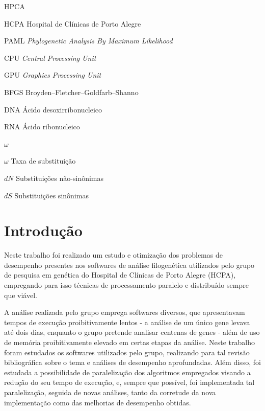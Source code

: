 \documentclass[cic,tc]{iiufrgs}
\begin{document}
\listoffigures

\listoftables

\begin{listofabbrv}{HPCA}
    \item[HCPA] Hospital de Clínicas de Porto Alegre
    \item[PAML] \textit{Phylogenetic Analysis By Maximum Likelihood}
    \item[CPU] \textit{Central Processing Unit}
    \item[GPU] \textit{Graphics Processing Unit}
    \item[BFGS] Broyden–Fletcher–Goldfarb–Shanno
    \item[DNA] Ácido desoxirribonucleico
    \item[RNA] Ácido ribonucleico
\end{listofabbrv}

\begin{listofsymbols}{$\omega$}
    \item[$\omega$] Taxa de substituição
    \item[$dN$] Substituições não-sinônimas
    \item[$dS$] Substituições sinônimas
\end{listofsymbols}

\tableofcontents


\chapter{Introdução}

Neste trabalho foi realizado um estudo e otimização dos problemas de desempenho
presentes nos softwares de análise filogenética utilizados pelo grupo de
pesquisa em genética do Hospital de Clínicas de Porto Alegre (HCPA), empregando
para isso técnicas de processamento paralelo e distribuído sempre que viável.

A análise realizada pelo grupo emprega softwares diversos, que apresentavam
tempos de execução proibitivamente lentos - a análise de um único gene levava
até dois dias, enquanto o grupo pretende analisar centenas de genes - além de
uso de memória proibitivamente elevado em certas etapas da análise. Neste
trabalho foram estudados os softwares utilizados pelo grupo, realizando para
tal revisão bibliográfica sobre o tema e análises de desempenho aprofundadas.
Além disso, foi estudada a possibilidade de paralelização dos algoritmos
empregados visando a redução do seu tempo de execução, e, sempre que possível,
foi implementada tal paralelização, seguida de novas análises, tanto da
corretude da nova implementação como das melhorias de desempenho obtidas.
\end{document}
